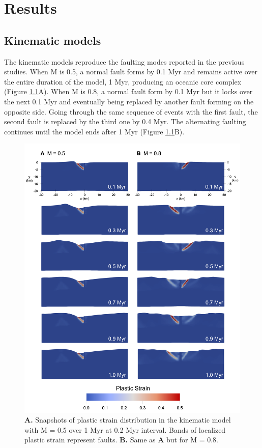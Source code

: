 \documentclass[letterpaper,12pt,notitle]{memphisthesis}                     %
\begin{document}
\chapter{Results}

\section{Kinematic models}

The kinematic models reproduce the faulting modes reported in the previous studies. When M is 0.5, a normal fault forms by 0.1 Myr and remains active over the entire duration of the model, 1 Myr, producing an oceanic core complex (Figure \ref{fig:kfault}A). When M is 0.8, a normal fault form by 0.1 Myr but it locks over the next 0.1 Myr and eventually being replaced by another fault forming on the opposite side. Going through the same sequence of events with the first fault, the second fault is replaced by the third one by 0.4 Myr. The alternating faulting continues until the model ends after 1 Myr (Figure \ref{fig:kfault}B).
%
\begin{figure}[!htb]
	\centering
	\includegraphics[width=0.74\linewidth,trim=20 30 20 20,clip]{./figs/kfault.png}
	\caption{ \textbf{A.} Snapshots of plastic strain distribution in the kinematic model with M = 0.5 over 1 Myr at 0.2 Myr interval. Bands of localized plastic strain represent faults. \textbf{B.} Same as \textbf{A} but for M = 0.8.}
	\label{fig:kfault}
\end{figure}
\end{document}
